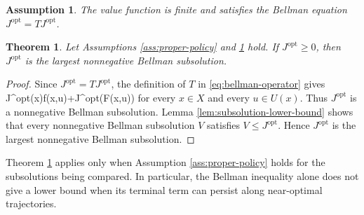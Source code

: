 \documentclass{article}
\newtheorem{assumption}{Assumption}
\newtheorem{theorem}{Theorem}
\begin{document}
\begin{assumption}
\label{ass:bellman-value}
The value function is finite and satisfies the Bellman equation $J^\textrm{opt}=TJ^\textrm{opt}$.
\end{assumption}

\begin{theorem}
\label{thm:maximal-subsolution}
Let Assumptions \ref{ass:proper-policy} and \ref{ass:bellman-value} hold. If $J^\textrm{opt}\geq 0$, then $J^\textrm{opt}$ is the largest nonnegative Bellman subsolution.
\end{theorem}

\begin{proof}
Since $J^\textrm{opt}=TJ^\textrm{opt}$, the definition of $T$ in \eqref{eq:bellman-operator} gives
\BEQ
J^\textrm{opt}(x)\leq f(x,u)+\gamma J^\textrm{opt}(F(x,u))
\label{eq:value-is-subsolution}
\EEQ
for every $x\in X$ and every $u\in U(x)$. Thus $J^\textrm{opt}$ is a nonnegative Bellman subsolution. Lemma \ref{lem:subsolution-lower-bound} shows that every nonnegative Bellman subsolution $V$ satisfies $V\leq J^\textrm{opt}$. Hence $J^\textrm{opt}$ is the largest nonnegative Bellman subsolution.
\end{proof}

Theorem \ref{thm:maximal-subsolution} applies only when Assumption \ref{ass:proper-policy} holds for the subsolutions being compared. In particular, the Bellman inequality alone does not give a lower bound when its terminal term can persist along near-optimal trajectories.
\end{document}
